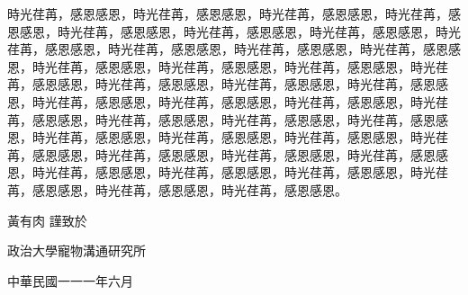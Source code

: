 \begin{acknowledgementszh}
時光荏苒，感恩感恩，時光荏苒，感恩感恩，時光荏苒，感恩感恩，時光荏苒，感恩感恩，時光荏苒，感恩感恩，時光荏苒，感恩感恩，時光荏苒，感恩感恩，時光荏苒，感恩感恩，時光荏苒，感恩感恩，時光荏苒，感恩感恩，時光荏苒，感恩感恩，時光荏苒，感恩感恩，時光荏苒，感恩感恩，時光荏苒，感恩感恩，時光荏苒，感恩感恩，時光荏苒，感恩感恩，時光荏苒，感恩感恩，時光荏苒，感恩感恩，時光荏苒，感恩感恩，時光荏苒，感恩感恩，時光荏苒，感恩感恩，時光荏苒，感恩感恩，時光荏苒，感恩感恩，時光荏苒，感恩感恩，時光荏苒，感恩感恩，時光荏苒，感恩感恩，時光荏苒，感恩感恩，時光荏苒，感恩感恩，時光荏苒，感恩感恩，時光荏苒，感恩感恩，時光荏苒，感恩感恩，時光荏苒，感恩感恩，時光荏苒，感恩感恩，時光荏苒，感恩感恩，時光荏苒，感恩感恩，時光荏苒，感恩感恩，時光荏苒，感恩感恩，時光荏苒，感恩感恩。\par


\begin{flushright}
黃有肉  \qquad 謹致於\par

政治大學寵物溝通研究所\par

中華民國一一一年六月\par

\end{flushright}

\end{acknowledgementszh}


